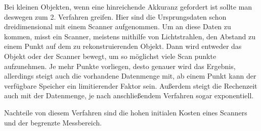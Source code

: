 \documentclass[../main.tex]{subfiles}
\begin{document}
Bei kleinen Objekten, wenn eine hinreichende Akkuranz gefordert ist sollte man 
deswegen zum 2. Verfahren greifen. Hier sind die Ursprungsdaten schon 
dreidimensional mit einem Scanner aufgenommen. Um an diese Daten zu kommen, 
misst ein Scanner, meistens mithilfe von Lichtstrahlen, den Abstand zu einem 
Punkt auf dem zu rekonstruierenden Objekt. Dann wird entweder das Objekt oder 
der Scanner bewegt, um so möglichst viele Scan punkte aufzunehmen.
Je mehr Punkte vorliegen, desto genauer wird das Ergebnis, allerdings steigt
auch die vorhandene Datenmenge mit, ab einem Punkt kann der verfügbare 
Speicher ein limitierender Faktor sein. Außerdem steigt die Rechenzeit auch mit
der Datenmenge, je nach anschließendem Verfahren sogar exponentiell.

Nachteile von diesem Verfahren sind die hohen initialen Kosten eines Scanners 
und der begrenzte Messbereich. 
\end{document}
